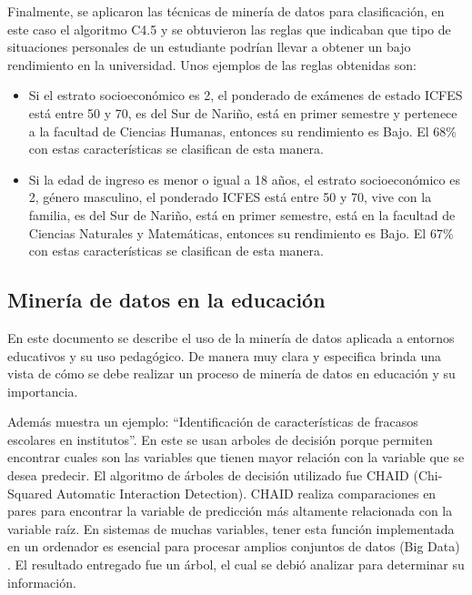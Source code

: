 Finalmente, se aplicaron las técnicas de minería de datos para clasificación, en este caso el algoritmo C4.5 y se obtuvieron las reglas que indicaban que tipo de situaciones personales de un estudiante podrían llevar a obtener un bajo rendimiento en la universidad. Unos ejemplos de las reglas obtenidas son:
\begin{itemize}
\item Si el estrato socioeconómico es 2, el ponderado de exámenes de estado ICFES está entre 50 y 70, es del Sur de Nariño, está en primer semestre y pertenece a la facultad de Ciencias Humanas, entonces su rendimiento es Bajo. El 68\% con estas características se clasifican de esta manera. 
\item Si la edad de ingreso es menor o igual a 18 años, el estrato socioeconómico es 2, género masculino, el ponderado ICFES está entre 50 y 70, vive con la familia, es del Sur de Nariño, está en primer semestre, está en la facultad de Ciencias Naturales y Matemáticas, entonces su rendimiento es Bajo. El 67\% con estas características se clasifican de esta manera. 
\end{itemize}
\subsection{Minería de datos en la educación \cite{key-110}}
En este documento se describe el uso de la minería de datos aplicada a entornos educativos y su uso pedagógico. De manera muy clara y especifica brinda una vista de cómo se debe realizar un proceso de minería de datos en educación y su importancia.

Además muestra un ejemplo: ``Identificación de características de fracasos escolares en institutos''. En este se usan arboles de decisión porque permiten encontrar cuales son las variables que tienen mayor relación con la variable que se desea predecir. El algoritmo de árboles de decisión utilizado fue CHAID \cite{key-120} (Chi-Squared Automatic Interaction Detection). CHAID realiza comparaciones en pares para encontrar la variable de predicción más altamente relacionada con la variable raíz. En sistemas de muchas variables, tener esta función implementada en un ordenador es esencial para procesar amplios conjuntos de datos (Big Data) \cite{key-110}. El resultado entregado fue un árbol, el cual se debió analizar para determinar su información.
